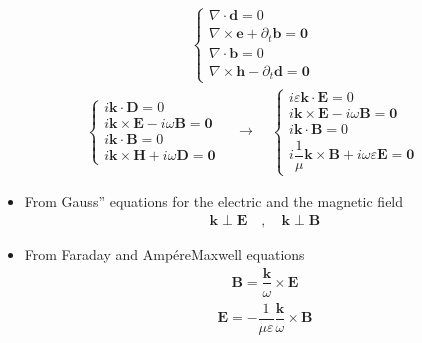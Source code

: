 \documentclass[letterpaper,10pt,italian]{jupyterBook}
\begin{document}
\begin{equation*}
\begin{split}
\begin{cases}
 \nabla \cdot \mathbf{d} = 0 \\
 \nabla \times \mathbf{e} + \partial_t \mathbf{b} = \mathbf{0} \\
 \nabla \cdot \mathbf{b} = 0 \\
 \nabla \times \mathbf{h} - \partial_t \mathbf{d} = \mathbf{0}
\end{cases}
\end{split}
\end{equation*}\begin{equation*}
\begin{split}
\begin{cases}
 i \mathbf{k} \cdot \mathbf{D} = 0 \\
 i \mathbf{k} \times \mathbf{E} - i \omega \mathbf{B} = \mathbf{0} \\
 i \mathbf{k} \cdot \mathbf{B} = 0 \\
 i \mathbf{k} \times \mathbf{H} + i \omega \mathbf{D} = \mathbf{0}
\end{cases}
\quad \rightarrow \quad
\begin{cases}
 i \varepsilon \mathbf{k} \cdot \mathbf{E} = 0 \\
 i \mathbf{k} \times \mathbf{E} - i \omega \mathbf{B} = \mathbf{0} \\
 i \mathbf{k} \cdot \mathbf{B} = 0 \\
 i \dfrac{1}{\mu} \mathbf{k} \times \mathbf{B} + i \omega \varepsilon \mathbf{E} = \mathbf{0}
\end{cases}
\end{split}
\end{equation*}\begin{itemize}
\item {} 
\sphinxAtStartPar
From Gauss” equations for the electric and the magnetic field
\begin{equation*}
\begin{split}\mathbf{k} \perp \mathbf{E} \quad , \quad \mathbf{k} \perp \mathbf{B}\end{split}
\end{equation*}
\item {} 
\sphinxAtStartPar
From Faraday and Ampére\sphinxhyphen{}Maxwell equations
\begin{equation*}
\begin{split}\mathbf{B} = \dfrac{\mathbf{k}}{\omega} \times \mathbf{E}\end{split}
\end{equation*}\begin{equation*}
\begin{split}\mathbf{E} = - \dfrac{1}{\mu \varepsilon}\dfrac{\mathbf{k}}{\omega} \times \mathbf{B}\end{split}
\end{equation*}
\end{itemize}
\end{document}
